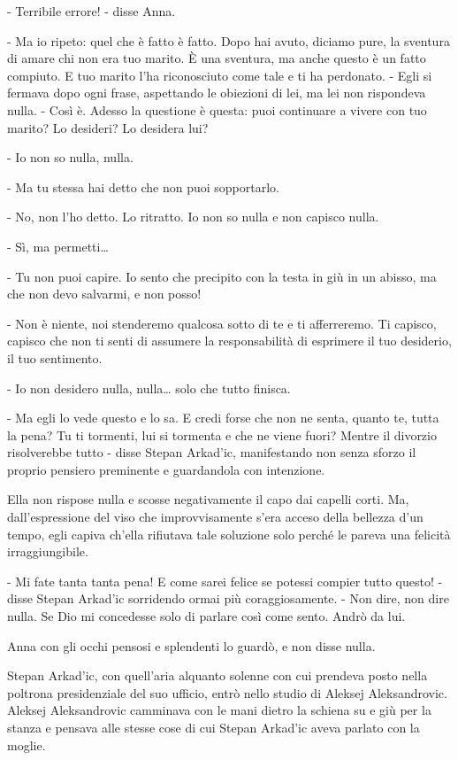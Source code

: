 - Terribile errore! - disse Anna. 

- Ma io ripeto: quel che è fatto è fatto. Dopo hai avuto, diciamo pure, la sventura di amare chi non era tuo marito. È una sventura, ma anche questo è un fatto compiuto. E tuo marito l'ha riconosciuto come tale e ti ha perdonato. - Egli si fermava dopo ogni frase, aspettando le obiezioni di lei, ma lei non rispondeva nulla. - Così è. Adesso la questione è questa: puoi continuare a vivere con tuo marito? Lo desideri? Lo desidera lui? 

- Io non so nulla, nulla. 

- Ma tu stessa hai detto che non puoi sopportarlo. 

- No, non l'ho detto. Lo ritratto. Io non so nulla e non capisco nulla. 

- Sì, ma permetti\ldots{} 

- Tu non puoi capire. Io sento che precipito con la testa in giù in un abisso, ma che non devo salvarmi, e non posso! 

- Non è niente, noi stenderemo qualcosa sotto di te e ti afferreremo. Ti capisco, capisco che non ti senti di assumere la responsabilità di esprimere il tuo desiderio, il tuo sentimento. 

- Io non desidero nulla, nulla\ldots{} solo che tutto finisca. 

- Ma egli lo vede questo e lo sa. E credi forse che non ne senta, quanto te, tutta la pena? Tu ti tormenti, lui si tormenta e che ne viene fuori? Mentre il divorzio risolverebbe tutto - disse Stepan Arkad'ic, manifestando non senza sforzo il proprio pensiero preminente e guardandola con intenzione. 

Ella non rispose nulla e scosse negativamente il capo dai capelli corti. Ma, dall'espressione del viso che improvvisamente s'era acceso della bellezza d'un tempo, egli capiva ch'ella rifiutava tale soluzione solo perché le pareva una felicità irraggiungibile. 

- Mi fate tanta tanta pena! E come sarei felice se potessi compier tutto questo! - disse Stepan Arkad'ic sorridendo ormai più coraggiosamente. - Non dire, non dire nulla. Se Dio mi concedesse solo di parlare così come sento. Andrò da lui. 

Anna con gli occhi pensosi e splendenti lo guardò, e non disse nulla. 

\label{xxii-3} 

Stepan Arkad'ic, con quell'aria alquanto solenne con cui prendeva posto nella poltrona presidenziale del suo ufficio, entrò nello studio di Aleksej Aleksandrovic. Aleksej Aleksandrovic camminava con le mani dietro la schiena su e giù per la stanza e pensava alle stesse cose di cui Stepan Arkad'ic aveva parlato con la moglie. 

